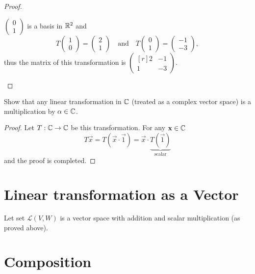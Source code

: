 \documentclass{article}
\begin{document}
\begin{proof}
\begin{enumerate}
\begin{itemize}
          $\begin{pmatrix} 0\\1 \end{pmatrix}$ is a basis in $\R^2$ and
          \[
            T\begin{pmatrix} 1\\0 \end{pmatrix}=\begin{pmatrix} 2\\1 \end{pmatrix}
            \quad\text{and}\quad
            T\begin{pmatrix} 0\\1 \end{pmatrix}=\begin{pmatrix} -1\\-3 \end{pmatrix},
          \]
          thus the matrix of this transformation is 
          $ \begin{pmatrix*}[r] 2 & -1\\1&-3 \end{pmatrix*} $.
      \end{itemize}
  \end{enumerate}
\end{proof}
\begin{exercise}
  Show that any linear transformation in $\C$ 
  (treated as a complex vector space) is a multiplication by 
  $\alpha\in\C$.
\end{exercise}
\begin{proof}
  Let $T:\C\to\C$ be this transformation. For any $\vec{x}\in\C$
  \[
    T\vec{x}=T(\vec{x}\cdot \vec{1})=\vec{x}\cdot \underbrace{T(\vec{1})}_{\text{scalar}}
  \]
  and the proof is completed.
\end{proof}
\section{Linear transformation as a Vector}
Let set $\mathcal{L}(V,W)$ is a vector space with addition and scalar 
multiplication (as proved above).
\section{Composition}
\end{document}
